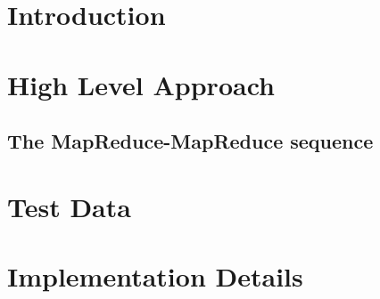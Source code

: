 \documentclass[a4paper,ngerman]{scrartcl}
\begin{document}
\section{Introduction}
\section{High Level Approach}
\subsection{The MapReduce-MapReduce sequence}

\section{Test Data}\label{test data}
\section{Implementation Details}

\end{document}
